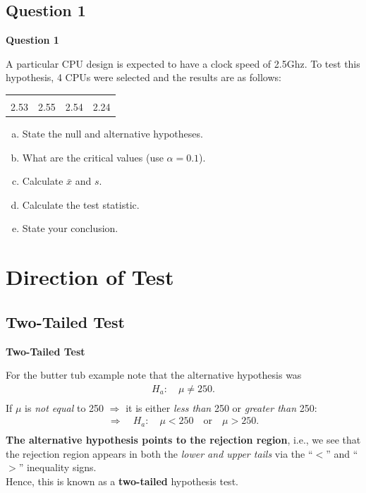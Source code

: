 \documentclass[compress]{beamer}        %
\makeatletter
\newcommand{\tcb}{\textcolor{beamer@blendedblue}}
\makeatother
\begin{document}
\subsection{Question 1}
\begin{frame}{\bf \tcb{Question 1}}

A particular CPU design is expected to have a clock speed of 2.5Ghz. To test this hypothesis, 4 CPUs were selected and the results are as follows:
\begin{center}
\begin{tabular}{|cccc|}
\hline
&&&\\[-0.4cm]
2.53 & 2.55 & 2.54 & 2.24 \\[0.1cm]
\hline
\end{tabular}
\end{center}

\begin{enumerate}[a)]\itemsep0.2cm
\item State the null and alternative hypotheses.
\item What are the critical values (use $\alpha = 0.1$).
\item Calculate $\bar x$ and $s$.
\item Calculate the test statistic.
\item State your conclusion.
\end{enumerate}

\end{frame}





\section{Direction of Test}
\subsection{Two-Tailed Test}
\begin{frame}{\bf \tcb{Two-Tailed Test}}

For the butter tub example note that the alternative hypothesis was\\[-0.2cm]
\begin{align*}
H_a: \quad \mu \ne 250.\\[-0.4cm]
\end{align*}
If $\mu$ is \emph{not equal} to 250 $\Rightarrow$ it is either \emph{less than} 250 or \emph{greater than} 250:\\[-0.2cm]
\begin{align*}
\Rightarrow \quad H_a: \quad \mu < 250 \quad\text{or}\quad \mu > 250.\\[-0.4cm]
\end{align*}
{\bf The alternative hypothesis points to the rejection region}, i.e., we see that the rejection region appears in both the \emph{lower and upper tails} via the ``$<$'' and ``$>$'' inequality signs.\\[0.7cm]

Hence, this is known as a {\bf two-tailed} hypothesis test.

\end{frame}
\end{document}
